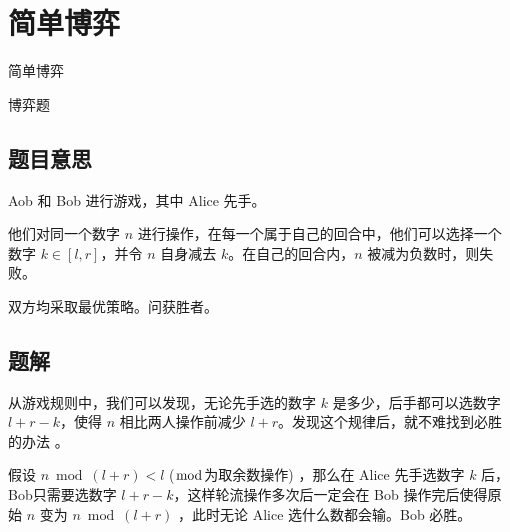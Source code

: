 \def\sectionName{简单博弈}
\section{\sectionName}



\begin{frame}

\isBeamerMode\relax
    {\Huge \sectionName}\par
\fi




博弈题



\end{frame}

\subsection{题目意思}
\begin{frame} %
Aob 和 Bob 进行游戏，其中 Alice 先手。

他们对同一个数字 $n$ 进行操作，在每一个属于自己的回合中，他们可以选择一个数字 $k
\in [l, r]$，并令 $n$ 自身减去 $k$。在自己的回合内，$n$ 被减为负数时，则失败。

双方均采取最优策略。问获胜者。
\end{frame}



\subsection{题解}
\begin{frame} %
从游戏规则中，我们可以发现，无论先手选的数字 $k$ 是多少，后手都可以选数字 $l + r
- k$，使得 $n$ 相比两人操作前减少 $l + r$。发现这个规律后，就不难找到必胜的办法
。

假设 $n \bmod (l + r) < l$  ($\bmod$为取余数操作) ，那么在 Alice 先手选数字 $k$
后，Bob只需要选数字 $l + r - k$，这样轮流操作多次后一定会在 Bob 操作完后使得原始
$n$ 变为 $n \bmod (l + r)$ ，此时无论 Alice 选什么数都会输。Bob 必胜。
\end{frame}


